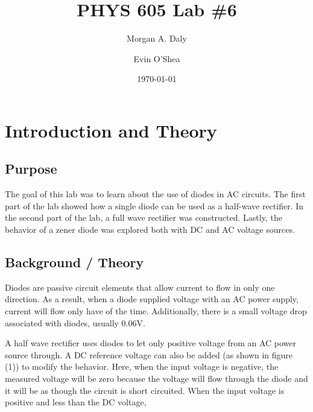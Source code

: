 \documentclass[twocolumn, amsmath]{revtex4}
\begin{document}
\title{PHYS 605 Lab \#6} 

\author{Morgan A. Daly}
\author{Evin O'Shea}
\date{\today} 


\maketitle


\section{Introduction and Theory}
\subsection{Purpose}

The goal of this lab was to learn about the use of diodes in AC circuits. The first part of the lab showed how a single diode can be used as a half-wave rectifier. In the second part of the lab, a full wave rectifier was constructed. Lastly, the behavior of a zener diode was explored both with DC and AC voltage sources.

\subsection{Background / Theory}

Diodes are passive circuit elements that allow current to flow in only one direction. As a result, when a diode supplied voltage with an AC power supply, current will flow only have of the time. Additionally, there is a small voltage drop associated with diodes, usually 0.06V.

A half wave rectifier uses diodes to let only positive voltage from an AC power source through. A DC reference voltage can also be added (as shown in figure (1)) to modify the behavior. Here, when the input voltage is negative, the measured voltage will be zero because the voltage will flow through the diode and it will be as though the circuit is short circuited. When the input voltage is positive and less than the DC voltage, %
\end{document}
